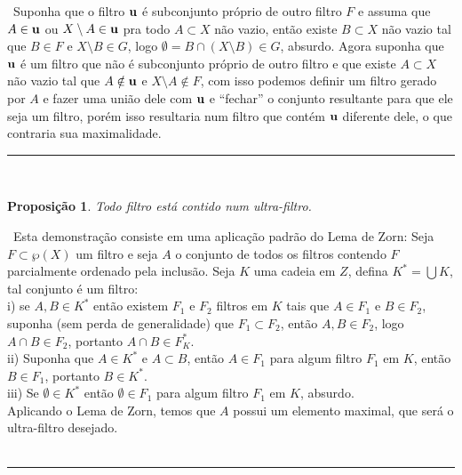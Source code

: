 \documentclass[12pt,a4paper]{article}
\newtheorem{prop}[mydef]{Proposição}
\def\dem{\par\smallbreak\noindent {\textit{ Demonstração:}} \ }
\def\eop{\hfill\rule{2.5mm}{2.5mm} \\ }
\theoremstyle{definition}
\begin{document}
\dem Suponha que o filtro $\bf{u}$ é subconjunto próprio de outro filtro $F$ e assuma que $A\in \bf{u}$ ou $X\setminus A \in \bf{u}$ pra todo $A\subset X$ não vazio, então existe $B \subset X$ não vazio tal que $B\in F$ e $X\setminus B\in G$, logo $\emptyset =B\cap (X\setminus B)\in G$, absurdo. Agora suponha que $\bf{u}$ é um filtro que não é subconjunto próprio de outro filtro e que existe $A\subset X$ não vazio tal que $A\notin \bf{u}$ e $X\setminus A \notin F$, com isso podemos definir um filtro gerado por $A$ e fazer uma união dele com $\bf{u}$ e ``fechar'' o conjunto resultante para que ele seja um filtro, porém isso resultaria num filtro que contém $\bf{u}$ diferente dele, o que contraria sua maximalidade. \eop

\begin{prop}
	
	Todo filtro está contido num ultra-filtro. 
	
\end{prop}

\dem Esta demonstração consiste em uma aplicação padrão do Lema de Zorn: Seja $F\subset \wp (X)$ um filtro e seja $A$ o conjunto de todos os filtros contendo $F$ parcialmente ordenado pela inclusão. Seja $K$ uma cadeia em $Z$, defina $K^*=\bigcup K$, tal conjunto é um filtro: \\

i) se $A,B\in K^*$ então existem $F_1$ e $F_2$ filtros em $K$ tais que $A\in F_1$ e $B\in F_2$, suponha (sem perda de generalidade) que $F_1\subset F_2$, então $A,B\in F_2$, logo $A\cap B\in F_2$, portanto $A\cap B\in F_K^*$. \\

ii) Suponha que  $A\in K^*$ e $A\subset B$, então $A\in F_1$ para algum filtro $F_1$ em $K$, então $B\in F_1$, portanto $B\in K^*$. \\

iii) Se $\emptyset \in K^*$ então $\emptyset \in F_1$ para algum filtro $F_1$ em $K$, absurdo. \\

Aplicando o Lema de Zorn, temos que $A$ possui um elemento maximal, que será o ultra-filtro desejado. \\ 

\ \eop
\end{document}
